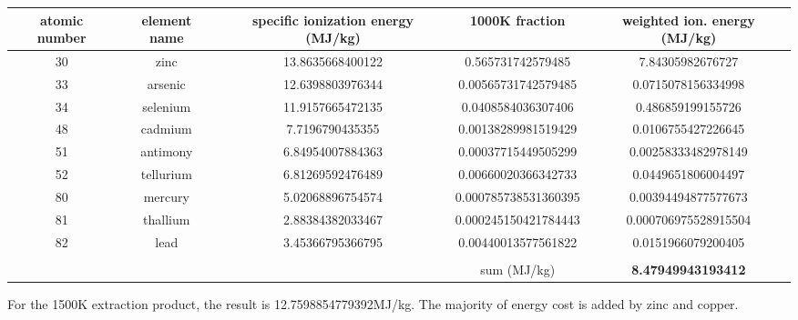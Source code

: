 \documentclass[a4paper]{article}
\begin{document}
	\begin{center}
		\scriptsize
		\begin{tabular}{|c|c|c|c|c|}
			\hline
			atomic number & element name & specific ionization energy (MJ/kg) & 1000K fraction & weighted ion. energy (MJ/kg) \\
			\hline
			30 & zinc & 13.8635668400122 & 0.565731742579485 & 7.84305982676727 \\
			\hline
			33 & arsenic & 12.6398803976344 & 0.00565731742579485 & 0.0715078156334998 \\
			\hline
			34 & selenium & 11.9157665472135 & 0.0408584036307406 & 0.486859199155726 \\
			\hline
			48 & cadmium & 7.7196790435355 & 0.00138289981519429 & 0.0106755427226645 \\
			\hline
			51 & antimony & 6.84954007884363 & 0.00037715449505299 & 0.00258333482978149 \\
			\hline
			52 & tellurium & 6.81269592476489 & 0.00660020366342733 & 0.0449651806004497 \\
			\hline
			80 & mercury & 5.02068896754574 & 0.000785738531360395 & 0.00394494877577673 \\
			\hline
			81 & thallium & 2.88384382033467 & 0.000245150421784443 & 0.000706975528915504 \\
			\hline
			82 & lead & 3.45366795366795 & 0.00440013577561822 & 0.0151966079200405 \\
			\hline
			&  &  &  &  \\
			\hline
			&  &  & sum (MJ/kg) & \textbf{8.47949943193412} \\
			\hline
		\end{tabular}
	\end{center}
	
	\bigskip
	
	For the 1500K extraction product, the result is 12.7598854779392MJ/kg.
	The majority of energy cost is added by zinc and copper.
	
\end{document}
